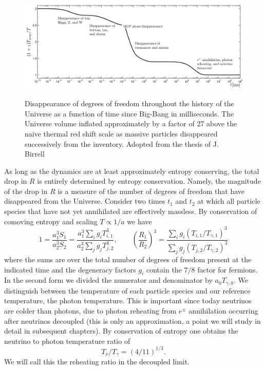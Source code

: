 {%
\begin{figure} 
\centerline{\includegraphics[height=5.2cm]{01-introduction/Figures/DOFtime.png}}
\caption{Disappearance of degrees of freedom throughout the history of the Universe as a function of time since Big-Bang in milliseconds. The Universe volume inflated approximately by a factor of 27 above the naive thermal red shift scale as massive particles disappeared successively from the inventory. Adopted from the thesis of J.\,Birrell~\cite{Birrell:2014ona} \label{fig:dof}}
 \end{figure}



As long as the dynamics are at least approximately entropy conserving, the total drop in $R$ is entirely determined by entropy conservation. Namely, the magnitude of the drop in $R$  is a measure of the number of degrees of freedom that have disappeared from the Universe. Consider two times $t_1$ and $t_2$ at which all particle species that have not yet annihilated are effectively massless. By conservation of comoving entropy and scaling $T\propto 1/a$ we have
\begin{equation}\label{r_ratio}
1=\frac{a_1^3S_{1}}{a_2^3 S_2}=\frac{a_1^3\sum_ig_i T_{i,1}^3}{a_2^3\sum_j g_j T_{j,2}^3},\qquad \left(\frac{R_1}{R_2}\right)^3=\frac{\sum_ig_i (T_{i,1}/T_{\gamma,1})^3}{\sum_j g_j (T_{j,2}/T_{\gamma,2})^3}
\end{equation}
where the sums are over the total number of degrees of freedom present at the indicated time and the degeneracy factors $g_i$ contain the $7/8$ factor for fermions. In the second form we divided the numerator and denominator by $a_{0}T_{\gamma,0}$. We distinguish between the temperature of each particle species and our reference temperature, the photon temperature. This is important since today neutrinos are colder than photons, due to photon reheating from $e^\pm$ annihilation occurring after neutrinos decoupled (this is only an approximation, a point we will study in detail in subsequent chapters). By conservation of entropy one obtains the neutrino to photon temperature ratio of
\begin{equation}\label{T_nu_T_gamma}
T_\nu/T_\gamma=({4}/{11})^{1/3}.
\end{equation}
We will call this the reheating ratio in the decoupled limit. 

}
